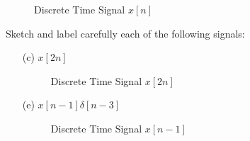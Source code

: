 \documentclass[fleqn]{article}
\begin{document}
\begin{enumerate}[nolistsep]
	
		\begin{figure}[H]		\centerline{}
		\caption{Discrete Time Signal $x[n]$}
		\label{prob_statement}
		\end{figure}
		
		Sketch and label carefully each of the following signals:
		
		\begin{enumerate}[nolistsep]
			\item[(c)] $x[2n]$
			
			
			\begin{figure}[H]				
			\centerline{}
		\caption{Discrete Time Signal $x[2n]$}
		\label{part_c}
		\end{figure}
		
			\item[(e)] $x[n - 1]\delta[n - 3]$
			
			\begin{figure}[H]
			\centerline{}
		\caption{Discrete Time Signal $x[n-1]$}
		\label{part_e_x_nm1}
		\end{figure}
			

\end{enumerate}
\end{enumerate}
\end{document}

